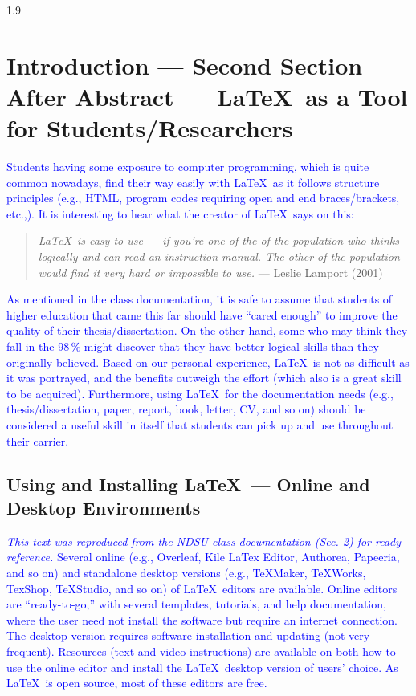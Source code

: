 \documentclass[phd]{ndsu-thesis-2022}
\newcommand\myspacing{1.9}      %
\newcommand\italk[1]{\textcolor{blue}{#1}}  %
\begin{document}
\begin{spacing}{\myspacing}
\vspace{-5ex}
\section{Introduction --- Second Section After Abstract --- \LaTeX\ as a Tool for Students/Researchers}
\italk{Students having some exposure to computer programming, which is quite common nowadays, find their way easily with \LaTeX\ as it follows structure principles (e.g., HTML, program codes requiring open and end braces/brackets, etc.,). It is interesting to hear what the creator of \LaTeX\ says on this:} 
\textcolor{magenta}{
\begin{quote}
\singlespacing
\raggedright
\textit{
\LaTeX\ is easy to use --- if you're one of the  of the population who thinks logically and can read an instruction manual. The other  of the population would find it very hard or impossible to use.} 
\hfill --- Leslie Lamport (2001)
\end{quote}
}

\italk{As mentioned in the class documentation, it is safe to assume that students of higher education that came this far should have ``cared enough'' to improve the quality of their thesis/dissertation. On the other hand, some who may think they fall in the 98\,\% might discover that they have better logical skills than they originally believed. Based on our personal experience, \LaTeX\ is not as difficult as it was portrayed, and the benefits outweigh the effort (which also is a great skill to be acquired). Furthermore, using \LaTeX\ for the documentation needs (e.g., thesis/dissertation, paper, report, book, letter, CV, and so on) should be considered a useful skill in itself that students can pick up and use throughout their carrier. 
} 

\subsection{Using and Installing \LaTeX\  --- Online and Desktop Environments}  
\italk{\emph{This text was reproduced from the NDSU class documentation (Sec. 2) for ready reference.} Several online (e.g., Overleaf, Kile LaTex Editor, Authorea, Papeeria, and so on) and standalone desktop versions (e.g., TeXMaker, TeXWorks, TexShop, TeXStudio, and so on) of \LaTeX\ editors are available. Online editors are ``ready-to-go,'' with several templates, tutorials, and help documentation, where the user need not install the software but require an internet connection. The desktop version requires software installation and updating (not very frequent). Resources (text and video instructions) are available on both how to use the online editor and install the \LaTeX\ desktop version of users' choice. As \LaTeX\ is open source, most of these editors are free.}


\end{spacing}
\end{document}

